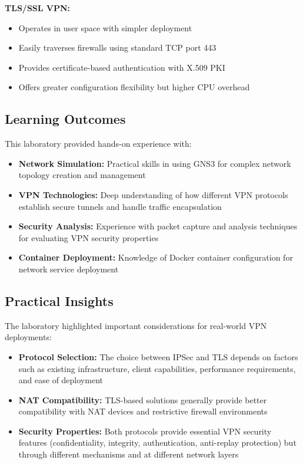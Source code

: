 \textbf{TLS/SSL VPN:}
\begin{itemize}
    \item Operates in user space with simpler deployment
    \item Easily traverses firewalls using standard TCP port 443
    \item Provides certificate-based authentication with X.509 PKI
    \item Offers greater configuration flexibility but higher CPU overhead
\end{itemize}

\subsection{Learning Outcomes}

This laboratory provided hands-on experience with:

\begin{itemize}
    \item \textbf{Network Simulation:} Practical skills in using GNS3 for complex network topology creation and management
    
    \item \textbf{VPN Technologies:} Deep understanding of how different VPN protocols establish secure tunnels and handle traffic encapsulation
    
    \item \textbf{Security Analysis:} Experience with packet capture and analysis techniques for evaluating VPN security properties
    
    \item \textbf{Container Deployment:} Knowledge of Docker container configuration for network service deployment
\end{itemize}

\subsection{Practical Insights}

The laboratory highlighted important considerations for real-world VPN deployments:

\begin{itemize}
    \item \textbf{Protocol Selection:} The choice between IPSec and TLS depends on factors such as existing infrastructure, client capabilities, performance requirements, and ease of deployment
    
    \item \textbf{NAT Compatibility:} TLS-based solutions generally provide better compatibility with NAT devices and restrictive firewall environments
    
    \item \textbf{Security Properties:} Both protocols provide essential VPN security features (confidentiality, integrity, authentication, anti-replay protection) but through different mechanisms and at different network layers
\end{itemize}

